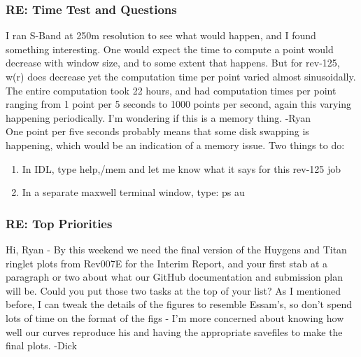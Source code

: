 \documentclass[crop=false,class=article,oneside]{standalone}
\begin{document}
\subsubsection{\footnotesize RE: Time Test and Questions}
I ran S-Band at 250m resolution to see what would happen, and I found something interesting.
One would expect the time to compute a point would decrease with window size, and to some extent that happens. But for rev-125, w(r) does decrease yet the computation time per point varied almost sinusoidally. The entire computation took 22 hours, and had computation times per point ranging from 1 point per 5 seconds to 1000 points per second, again this varying happening periodically. I'm wondering if this is a memory thing. -Ryan\\
One point per five seconds probably means that some disk swapping is happening, which would be an indication of a memory issue. Two things to do:
\begin{enumerate}
    \item In IDL, type help,/mem and let me know what it says for this rev-125 job
    \item In a separate maxwell terminal window, type: ps au
\end{enumerate}
\subsubsection{\footnotesize RE: Top Priorities}
Hi, Ryan - By this weekend we need the final version of the Huygens and Titan ringlet plots from Rev007E for the Interim Report, and your first stab at a paragraph or two about what our GitHub documentation and submission plan will be. Could you put those two tasks at the top of your list? As I mentioned before, I can tweak the details of the figures to resemble Essam's, so don't spend lots of time on the format of the figs - I'm more concerned about knowing how well our curves reproduce his and having the appropriate savefiles to make the final plots. -Dick
\end{document}
